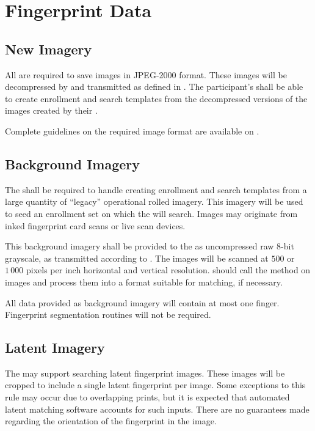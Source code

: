 \section{Fingerprint Data}
\label{sec:fingerprint_data}

\subsection{New Imagery}
All \scanners are required to save images in JPEG-2000 format. These images
will be decompressed by \beframework and transmitted as defined in
. The participant's \lib shall be able to create
enrollment and search templates from the decompressed versions of the images
created by their \scanner.

Complete guidelines on the required image format are available on
\theprojectwebsite.

\subsection{Background Imagery}
The \lib shall be required to handle creating enrollment and search templates
from a large quantity of ``legacy'' operational rolled imagery. This imagery
will be used to seed an enrollment set on which the \lib will search. Images
may originate from inked fingerprint card scans or live scan devices.

This background imagery shall be provided to the \lib as uncompressed raw 8-bit
grayscale, as transmitted according to . The images
will be scanned at $500$ or $1\,000$ pixels per inch horizontal and vertical
resolution. \Libs should call the  method on images and
process them into a format suitable for matching, if necessary.

All data provided as background imagery will contain at most one finger.
Fingerprint segmentation routines will not be required.

\subsection{Latent Imagery}
The \lib may support searching latent fingerprint images. These images will
be cropped to include a single latent fingerprint per image. Some exceptions
to this rule may occur due to overlapping prints, but it is expected that
automated latent matching software accounts for such inputs. There are no
guarantees made regarding the orientation of the fingerprint in the image.

